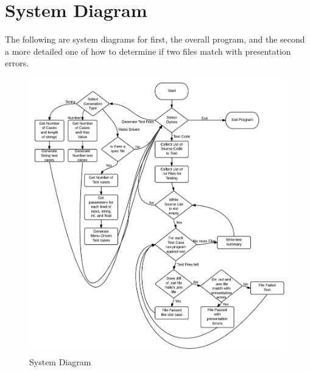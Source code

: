 \section {System Diagram}
The following are system diagrams for first, the overall program, and the second a more detailed
one of how to determine if two files match with presentation errors.

\begin {figure}[tbh]
\begin {center}
\includegraphics[width=1\textwidth]{./SystemDiagram}
\end{center}
\caption{System Diagram\label{systemdiagram}}
\end{figure}

